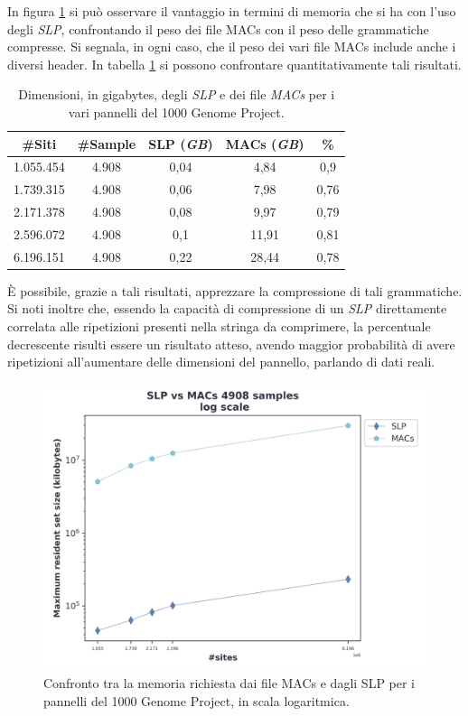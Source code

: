 In figura \ref{fig:slpmacschr} si può osservare il vantaggio in termini di
memoria che si ha con l'uso degli \textit{SLP}, confrontando il peso dei file
MACs con il peso delle grammatiche compresse. Si segnala, in ogni caso, che il
peso dei vari file MACs include anche i diversi header. In tabella
\ref{tab:slpmacs} si possono
confrontare quantitativamente tali risultati.
\begin{table}
  \centering
  \caption{Dimensioni, in gigabytes, degli \textit{SLP} e dei file \textit{MACs}
  per i vari pannelli del 1000 Genome Project.}
  \begin{tabular}{c|c|c|c|c}
    \textbf{\#Siti} & \textbf{\#Sample} & \textbf{SLP (\textit{GB})}
    & \textbf{MACs (\textit{GB})} & \textbf{\%}\\
    \hline
    1.055.454 & 4.908 & 0,04 & 4,84 & 0,9\\
    1.739.315 & 4.908 & 0,06 & 7,98 & 0,76\\
    2.171.378 & 4.908 & 0,08 & 9,97 & 0,79\\
    2.596.072 & 4.908 & 0,1 & 11,91 & 0,81\\
    6.196.151 & 4.908 & 0,22 & 28,44 & 0,78\\
  \end{tabular}
  \label{tab:slpmacs}
\end{table}
È possibile, grazie a tali risultati, apprezzare la compressione di tali
grammatiche.  
Si noti inoltre che, essendo la capacità di compressione di un \textit{SLP}
direttamente correlata alle ripetizioni presenti nella stringa da comprimere, la
percentuale decrescente risulti essere un risultato atteso, avendo maggior
probabilità di avere ripetizioni all'aumentare delle dimensioni del pannello,
parlando di dati reali.
\begin{figure}
  \centering
  \includegraphics[width=0.7\linewidth]{img/slp_vs_macs_log.png}
  \caption{Confronto tra la memoria richiesta dai file MACs e dagli SLP per i
    pannelli del 1000 Genome Project, in scala
    logaritmica.} 
  \label{fig:slpmacschr}
\end{figure}
